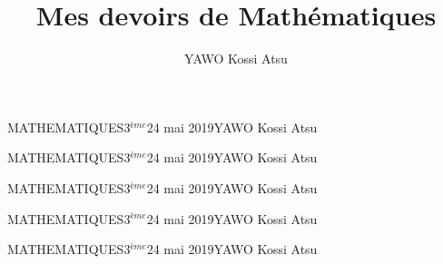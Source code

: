 \documentclass[12pt,a4paper]{book}
\author{YAWO Kossi Atsu}
\title{Mes devoirs de Mathématiques}
\newcommand{\prof}{YAWO Kossi Atsu}
\newcommand{\matiere}{MATHEMATIQUES}
\newcommand{\classe}{3$^{ème}$}
\begin{document}
\begin{td}{\matiere}{\classe}{24 mai 2019}{\prof}
\end{td}

\begin{td}{\matiere}{\classe}{24 mai 2019}{\prof}

\end{td}

\begin{td}{\matiere}{\classe}{24 mai 2019}{\prof}

\end{td}

\begin{td}{\matiere}{\classe}{24 mai 2019}{\prof}

\end{td}

\begin{td}{\matiere}{\classe}{24 mai 2019}{\prof}

\end{td}
\end{document}
